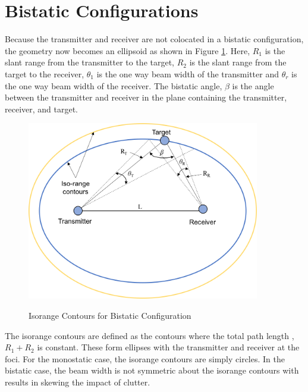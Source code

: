\section{Bistatic Configurations}
Because the transmitter and receiver are not colocated in a bistatic configuration, the geometry now becomes an ellipsoid as shown in Figure \ref{intro_fig:2}. Here, $R_1$ is the slant range from the transmitter to the target, $R_2$ is the slant range from the target to the receiver, $\theta_1$ is the one way beam width of the transmitter and $\theta_r$ is the one way beam width of the receiver. The bistatic angle, $\beta$ is the angle between the transmitter and receiver in the plane containing the transmitter, receiver, and target. 
\begin{figure}[H]
  \begin{center}
\includegraphics[width=4in]{../media/multistatic/Isorange_contours.png}
  \end{center}
  \renewcommand{\baselinestretch}{1} \small\normalsize
  \begin{quote}
    \caption[Isorange Contours for Bistatic Configuration]{Isorange Contours for Bistatic Configuration \label{intro_fig:2}}
  \end{quote}
\end{figure}
\renewcommand{\baselinestretch}{2} \small\normalsize
The isorange contours are defined as the contours where the total path length , $R_1 + R_2$ is constant. These form ellipses with the transmitter and receiver at the foci. For the monostatic case, the isorange contours are simply circles. In the bistatic case, the beam width is not symmetric about the isorange contours with results in skewing the impact of clutter.

